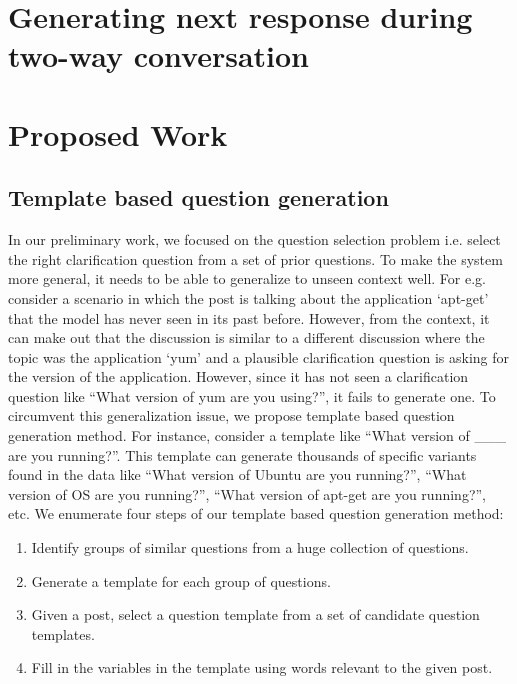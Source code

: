 \documentclass[11pt]{report}
\numberwithin{equation}{section}
\begin{document}
\newpage

\chapter{Generating next response during two-way conversation}

\newpage

\chapter{Proposed Work}

\section{Template based question generation}

In our preliminary work, we focused on the question selection problem i.e. select the right clarification question from a set of prior questions. To make the system more general, it needs to be able to generalize to unseen context well. For e.g. consider a scenario in which the post is talking about the application `apt-get' that the model has never seen in its past before. However, from the context, it can make out that the discussion is similar to a different discussion where the topic was the application `yum' and a plausible clarification question is asking for the version of the application. However, since it has not seen a clarification question like ``What version of yum are you using?'', it fails to generate one. To circumvent this generalization issue, we propose template based question generation method. For instance, consider a template like ``What version of \_\_\_  are you running?''. This template can generate thousands of specific variants found in the data like ``What version of Ubuntu are you running?'', ``What version of OS are you running?'', ``What version of apt-get are you running?'', etc. We enumerate four steps of our template based question generation method:
\begin{enumerate}
\item Identify groups of similar questions from a huge collection of questions.
\item Generate a template for each group of questions.
\item Given a post, select a question template from a set of candidate question templates.
\item Fill in the variables in the template using words relevant to the given post.
\end{enumerate}
\end{document}
